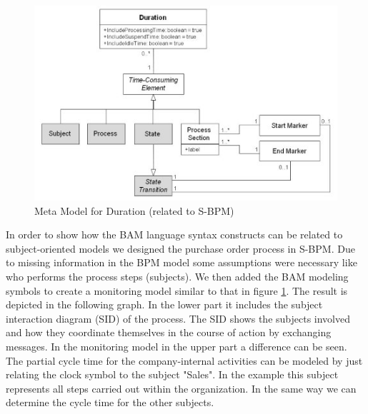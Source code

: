 \begin{figure}[htbp]
	\centering
	\includegraphics[width=0.9\linewidth]{Figures/Chapter5/Monitoring/Meta-Mode-fo-Duration-relate- to-SBPM.jpg}
	\caption[Meta Model for Duration (related to S-BPM)]{Meta Model for Duration (related to S-BPM)}
	\label{fig:Meta-Model-S_BPM}
\end{figure}


In order to show how the BAM language syntax constructs can be related to subject-oriented models we designed the purchase order process in S-BPM. Due to missing information in the BPM model some assumptions were necessary like who performs the process steps (subjects). We then added the BAM modeling symbols to create a monitoring model similar to that in figure \ref{fig:Meta-Model-S_BPM}.
The result is depicted in the following graph. In the lower part it includes the subject interaction diagram (SID) of the process. The SID shows the subjects involved and how they coordinate themselves in the course of action by exchanging messages. In the monitoring model in the upper part a difference can be seen. The partial cycle time for the company-internal activities can be modeled by just relating the clock symbol to the subject "Sales". In the example this subject represents all steps carried out within the organization. In the same way we can determine the cycle time for the other subjects.

